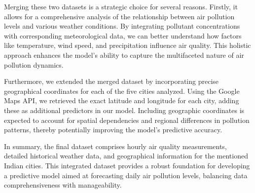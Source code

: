\documentclass[twoside,11pt]{article}
\begin{document}
Merging these two datasets is a strategic choice for several reasons. Firstly, it allows for a comprehensive analysis of the relationship between air pollution levels and various weather conditions. By integrating pollutant concentrations with corresponding meteorological data, we can better understand how factors like temperature, wind speed, and precipitation influence air quality. This holistic approach enhances the model's ability to capture the multifaceted nature of air pollution dynamics.

Furthermore, we extended the merged dataset by incorporating precise geographical coordinates for each of the five cities analyzed. Using the Google Maps API, we retrieved the exact latitude and longitude for each city, adding these as additional predictors in our model. Including geographic coordinates is expected to account for spatial dependencies and regional differences in pollution patterns, thereby potentially improving the model's predictive accuracy.

In summary, the final dataset comprises hourly air quality measurements, detailed historical weather data, and geographical information for the mentioned Indian cities. This integrated dataset provides a robust foundation for developing a predictive model aimed at forecasting daily air pollution levels, balancing data comprehensiveness with manageability.


\newpage












\end{document}
